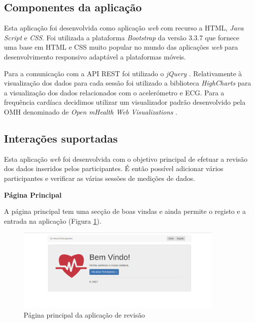 \subsection{Componentes da aplicação}
Esta aplicação foi desenvolvida como aplicação \textit{web} com recurso a \gls{HTML}, \textit{Java Script} e \textit{\gls{CSS}}. Foi utilizada a plataforma \textit{Bootstrap} \cite{bootstrap} da versão 3.3.7 que fornece uma base em \gls{HTML} e \gls{CSS} muito popular no mundo das aplicações \textit{web} para desenvolvimento responsivo adaptável a plataformas móveis. \par
Para a comunicação com a \gls{API} \gls{REST} foi utilizado o \textit{jQuery} \cite{jquery}.
Relativamente à visualização dos dados para cada sessão foi utilizado a biblioteca \textit{HighCharts} \cite{highcharts} para a visualização dos dados relacionados com o acelerómetro e \gls{ECG}. Para a frequência cardíaca decidimos utilizar um visualizador padrão desenvolvido pela \gls{OMH} denominado de \textit{Open mHealth Web Visualizations} \cite{omhwebvisualizations}.

\subsection{Interações suportadas }


Esta aplicação \textit{web} foi desenvolvida com o objetivo principal de efetuar a revisão dos dados inseridos pelos participantes. É então possível adicionar vários participantes e verificar as várias sessões de medições de dados.
\par
\textbf{Página Principal}
\par
A página principal tem uma secção de boas vindas e ainda permite o registo e a entrada na aplicação (Figura \ref{f:web-home}).

\begin{figure}[H]
\centering
\includegraphics[width=0.9\textwidth]{imgs/home.png}
\caption[Página principal da aplicação de revisão]{Página principal da aplicação de revisão}
\label{f:web-home}
\end{figure}

